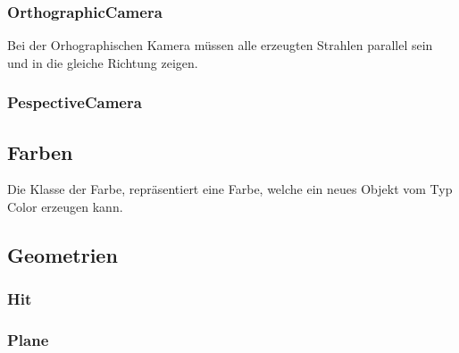 \documentclass[14pt]{extarticle}
\begin{document}
\subsubsection{OrthographicCamera}
Bei der Orhographischen Kamera müssen alle erzeugten Strahlen parallel sein und in die gleiche Richtung zeigen.
\subsubsection{PespectiveCamera}  
\subsection{Farben}
Die Klasse der Farbe, repräsentiert eine Farbe, welche ein neues Objekt vom Typ Color erzeugen kann.
\subsection{Geometrien}
\subsubsection{Hit}
\subsubsection{Plane}
\end{document}
